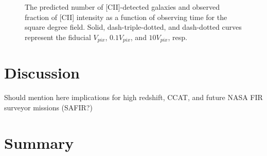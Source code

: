 \documentclass[12pt,preprint]{emulateapj}
\begin{document}
\begin{figure}[h]
 \centering
 \centering
\caption{The predicted number of [CII]-detected galaxies and observed fraction of [CII] intensity as a function of observing time for the square degree field. Solid, dash-triple-dotted, and dash-dotted curves represent the fiducial $V_{pix}$, $0.1V_{pix}$, and $10 V_{pix}$, resp.}
\label{fig:ngal_frac}
\end{figure}

\section{Discussion}

Should mention here implications for high redshift, CCAT, and future NASA FIR surveyor missions (SAFIR?)

\section{Summary}
\end{document}
